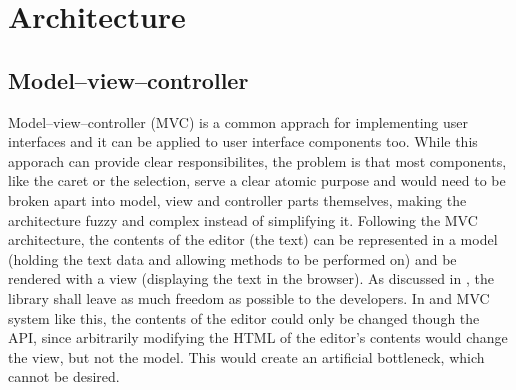 \chapter{Architecture}
\label{sec:impl_architecture}



\section{Model--view--controller}

Model--view--controller (MVC) is a common apprach for implementing user interfaces and it can be applied to user interface components too. While this apporach can provide clear responsibilites, the problem is that most components, like the caret or the selection, serve a clear atomic purpose and would need to be broken apart into model, view and controller parts themselves, making the architecture fuzzy and complex instead of simplifying it. Following the MVC architecture, the contents of the editor (the text) can be represented in a model (holding the text data and allowing methods to be performed on) and be rendered with a view (displaying the text in the browser). As discussed in , the library shall leave as much freedom as possible to the developers. In and MVC system like this, the contents of the editor could only be changed though the API, since arbitrarily modifying the HTML of the editor's contents would change the view, but not the model. This would create an artificial bottleneck, which cannot be desired.



